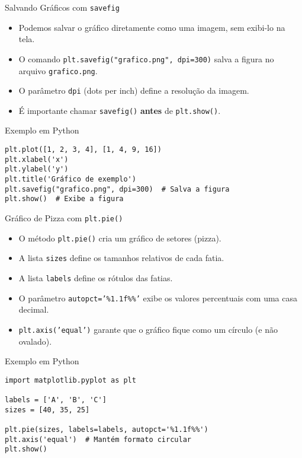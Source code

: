 \begin{frame}[fragile]{Salvando Gráficos com \texttt{savefig}}
    \begin{itemize}
        \item Podemos salvar o gráfico diretamente como uma imagem, sem exibi-lo na tela.
        \item O comando \texttt{plt.savefig("grafico.png", dpi=300)} salva a figura no arquivo \texttt{grafico.png}.
        \item O parâmetro \texttt{dpi} (dots per inch) define a resolução da imagem.
        \item É importante chamar \texttt{savefig()} \textbf{antes} de \texttt{plt.show()}.
    \end{itemize}

    \begin{block}{Exemplo em Python}
\begin{verbatim}
plt.plot([1, 2, 3, 4], [1, 4, 9, 16])
plt.xlabel('x')
plt.ylabel('y')
plt.title('Gráfico de exemplo')
plt.savefig("grafico.png", dpi=300)  # Salva a figura
plt.show()  # Exibe a figura
\end{verbatim}
    \end{block}
\end{frame}

\begin{frame}[fragile]{Gráfico de Pizza com \texttt{plt.pie()}}
    \begin{itemize}
        \item O método \texttt{plt.pie()} cria um gráfico de setores (pizza).
        \item A lista \texttt{sizes} define os tamanhos relativos de cada fatia.
        \item A lista \texttt{labels} define os rótulos das fatias.
        \item O parâmetro \texttt{autopct='\%1.1f\%\%'} exibe os valores percentuais com uma casa decimal.
        \item \texttt{plt.axis('equal')} garante que o gráfico fique como um círculo (e não ovalado).
    \end{itemize}

    \begin{block}{Exemplo em Python}
\begin{verbatim}
import matplotlib.pyplot as plt

labels = ['A', 'B', 'C']
sizes = [40, 35, 25]

plt.pie(sizes, labels=labels, autopct='%1.1f%%')
plt.axis('equal')  # Mantém formato circular
plt.show()
\end{verbatim}
    \end{block}
\end{frame}

